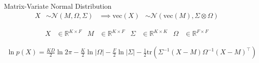 \documentclass[xcolor=dvipsnames]{beamer}
\newcommand \vecf[1] {
    \text{vec}\left(#1\right)
}
\newcommand \halve[1] {
	\frac{#1}{2}
}
\newcommand \half {
    \halve{1}
}
\newcommand \tr { \text{tr} }
\newcommand \T { ^\top }
\newcommand \nor[2]   { \mathcal{N} \left( {#1}, {#2} \right) }
\newcommand \mnor[3]  { \mathcal{N} \left(#1, #2, #3\right) }
\newcommand \Tr[1]   { \tr \left(  {#1}  \right) }
\newcommand \MReal[2] { { \mathbb{R}^{#1 \times #2} } }
\newcommand \inv[1] { {#1}^{-1} }
\begin{document}

\begin{frame}{Matrix-Variate Normal Distribution}
\begin{align*}
X & \sim \mnor{M}{\Omega}{\Sigma} & \implies \vecf{X} & \sim \nor{\vecf{M}}{\Sigma \otimes \Omega}
\end{align*}

 {
    {\small
        \begin{align*}
        X & \in \MReal{K}{F} &
        M & \in \MReal{K}{F} &
        \Sigma & \in \MReal{K}{K} &
        \Omega & \in \MReal{F}{F}
        \end{align*}
    }
}

 {
    {\small
        \begin{align*}
        \ln p(X) = \frac{KD}{2}\ln 2\pi - \frac{K}{2}\ln |\Omega| - \frac{F}{2}\ln |\Sigma| -\half \Tr{\inv{\Sigma}(X - M)\inv{\Omega}(X - M)\T}
        \end{align*}
    }
}

\end{frame}



\end{document}

